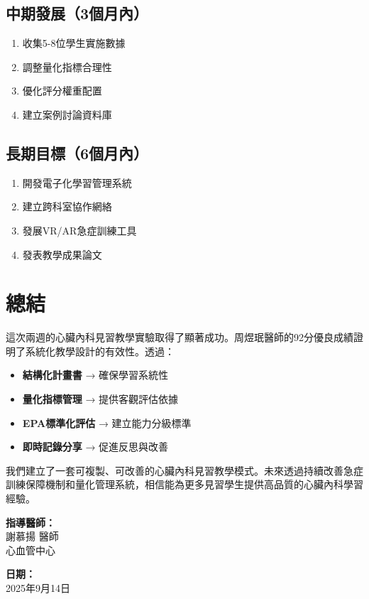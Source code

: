 \documentclass[12pt,a4paper]{article}
\begin{document}
\subsection{中期發展（3個月內）}
\begin{enumerate}
\item 收集5-8位學生實施數據
\item 調整量化指標合理性
\item 優化評分權重配置
\item 建立案例討論資料庫
\end{enumerate}

\subsection{長期目標（6個月內）}
\begin{enumerate}
\item 開發電子化學習管理系統
\item 建立跨科室協作網絡
\item 發展VR/AR急症訓練工具
\item 發表教學成果論文
\end{enumerate}

\section{總結}

這次兩週的心臟內科見習教學實驗取得了顯著成功。周煜珉醫師的92分優良成績證明了系統化教學設計的有效性。透過：

\begin{itemize}
\item \textbf{結構化計畫書} → 確保學習系統性
\item \textbf{量化指標管理} → 提供客觀評估依據  
\item \textbf{EPA標準化評估} → 建立能力分級標準
\item \textbf{即時記錄分享} → 促進反思與改善
\end{itemize}

我們建立了一套可複製、可改善的心臟內科見習教學模式。未來透過持續改善急症訓練保障機制和量化管理系統，相信能為更多見習學生提供高品質的心臟內科學習經驗。

\vspace{1cm}
\noindent
\begin{minipage}{0.5\textwidth}
\textbf{指導醫師：}\\
謝慕揚 醫師\\
心血管中心
\end{minipage}
\begin{minipage}{0.5\textwidth}
\textbf{日期：}\\
2025年9月14日
\end{minipage}
\end{document}
